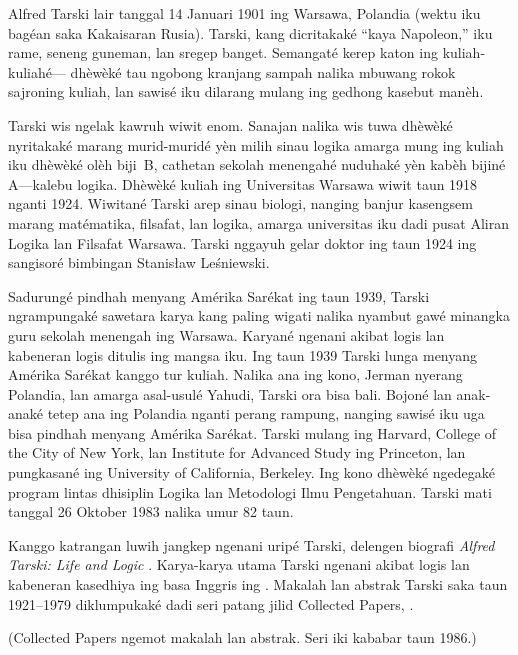 \documentclass[../../../include/open-logic-section]{subfiles}
\begin{document}



Alfred Tarski lair tanggal 14 Januari 1901
ing Warsawa, Polandia (wektu iku bagéan
saka Kakaisaran Rusia). Tarski, kang
dicritakaké ``kaya Napoleon,'' iku
rame, seneng guneman, lan sregep banget.
Semangaté kerep katon ing kuliah-kuliahé---
dhèwèké tau ngobong kranjang sampah
nalika mbuwang rokok sajroning kuliah,
lan sawisé iku dilarang mulang ing
gedhong kasebut manèh.

Tarski wis ngelak kawruh wiwit enom.
Sanajan nalika wis tuwa dhèwèké
nyritakaké marang murid-muridé yèn
milih sinau logika amarga mung ing
kuliah iku dhèwèké olèh biji~B,
cathetan sekolah menengahé nuduhaké
yèn kabèh bijiné A---kalebu logika.
Dhèwèké kuliah ing Universitas
Warsawa wiwit taun 1918 nganti 1924.
Wiwitané Tarski arep sinau biologi,
nanging banjur kasengsem marang
matématika, filsafat, lan logika,
amarga universitas iku dadi pusat
Aliran Logika lan Filsafat Warsawa.
Tarski nggayuh gelar doktor
ing taun 1924 ing sangisoré
bimbingan Stanis\l{}aw
Le\'{s}niewski.

Sadurungé pindhah menyang Amérika
Sarékat ing taun 1939, Tarski
ngrampungaké sawetara karya
kang paling wigati nalika
nyambut gawé minangka guru
sekolah menengah ing Warsawa.
Karyané ngenani akibat logis
lan kabeneran logis ditulis
ing mangsa iku. Ing taun 1939
Tarski lunga menyang Amérika
Sarékat kanggo tur kuliah.
Nalika ana ing kono, Jerman
nyerang Polandia, lan amarga
asal-usulé Yahudi, Tarski
ora bisa bali. Bojoné lan
anak-anaké tetep ana ing
Polandia nganti perang rampung,
nanging sawisé iku uga bisa
pindhah menyang Amérika Sarékat.
Tarski mulang ing Harvard,
College of the City of New York,
lan Institute for Advanced
Study ing Princeton, lan
pungkasané ing University
of California, Berkeley.
Ing kono dhèwèké ngedegaké
program lintas dhisiplin
Logika lan Metodologi Ilmu
Pengetahuan. Tarski mati
tanggal 26 Oktober 1983
nalika umur 82 taun.

\begin{reading}
Kanggo katrangan luwih jangkep
ngenani uripé Tarski, delengen
biografi \emph{Alfred Tarski: Life
  and Logic} \citep{Feferman2004}.
Karya-karya utama Tarski ngenani
akibat logis lan kabeneran
kasedhiya ing basa Inggris
ing \citep{Tarski1983}.
Makalah lan abstrak Tarski
saka taun 1921--1979 diklumpukaké dadi
seri patang jilid Collected Papers,
\citep{Tarski1981}.
\end{reading}
(Collected Papers ngemot makalah lan abstrak. Seri iki kababar taun 1986.)
\end{document}
